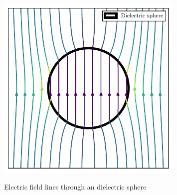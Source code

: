 \begin{figure}[!htbp]
  \centering
  \includegraphics[width=0.8\textwidth]{./../figures/field-dielectric-sphere.pdf}
  \label{fig:field-dielectric-sphere}
  \caption{Electric field lines through an dielectric sphere}
\end{figure}

